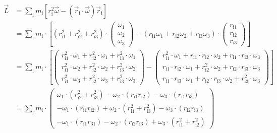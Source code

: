 \begin{align}
    \vec{L}&=\sum_\text{i}m_\text{i}\left[r_\text{i}^2\vec{\omega}-\left(\vec{r}_\text{i}\cdot\vec{\omega}\right)\vec{r}_\text{i}\right]\\
    &=\sum_\text{i}m_\text{i}\cdot\left[\left(r^2_{\text{i}1}+r^2_{\text{i}2}+r^2_{\text{i}3}\right)\cdot \begin{pmatrix}\omega_1\\\omega_2\\\omega_3\end{pmatrix}-\left(r_{\text{i}1}\omega_1+r_{\text{i}2}\omega_2+r_{\text{i}3}\omega_3\right)\cdot\begin{pmatrix}r_{\text{i}1}\\r_{\text{i}2}\\r_{\text{i}3}\end{pmatrix}\right]\\
    &=\sum_\text{i}m_\text{i}\cdot\left[\begin{pmatrix}r^2_{\text{i}1}\cdot\omega_1+r^2_{\text{i}2}\cdot\omega_1+r^2_{\text{i}3}\cdot\omega_1\\r^2_{\text{i}1}\cdot\omega_2+r^2_{\text{i}2}\cdot\omega_2+r^2_{\text{i}3}\cdot\omega_2\\r^2_{\text{i}1}\cdot\omega_3+r^2_{\text{i}2}\cdot\omega_3+r^2_{\text{i}3}\cdot\omega_3\end{pmatrix}-\begin{pmatrix}r^2_{\text{i}1}\cdot\omega_1+r_{\text{i}1}\cdot r_{\text{i}2}\cdot\omega_2+r_{\text{i}1}\cdot r_{\text{i}3}\cdot\omega_3\\r_{\text{i}1}\cdot r_{\text{i}2}\cdot\omega_1+r^2_{\text{i}2}\cdot\omega_2+r_{\text{i}2}\cdot r_{\text{i}3}\cdot \omega_3\\r_{\text{i}1}\cdot r_{\text{i}3}\cdot\omega_1+r_{\text{i}2}\cdot r_{\text{i}3}\cdot\omega_2+r^2_{\text{i}3}\cdot\omega_3\end{pmatrix}\right]\\
    &=\sum_\text{i}m_\text{i}\cdot\begin{pmatrix}\omega_1\cdot\left(r^2_{\text{i}2}+r^2_{\text{i}3}\right)-\omega_2\cdot\left(r_{\text{i}1}r_{\text{i}2}\right)-\omega_3\cdot\left(r_{\text{i}1}r_{\text{i}3}\right)\\-\omega_1\cdot\left(r_{\text{i}1}r_{\text{i}2}\right)+\omega_2\cdot\left(r^2_{\text{i}1}+r^2_{\text{i}3}\right)-\omega_3\cdot\left(r_{\text{i}2}r_{\text{i}3}\right)\\-\omega_1\cdot\left(r_{\text{i}1}r_{\text{3}1}\right)-\omega_2\cdot\left(r_{\text{i}2}r_{\text{i}3}\right)+\omega_3\cdot\left(r^2_{\text{i}1}+r^2_{\text{i}2}\right)\end{pmatrix}\\

\end{align}
